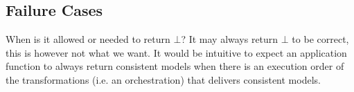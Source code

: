 




\subsection{Failure Cases} %
When is it allowed or needed to return $\bot$?
It may always return $\bot$ to be correct, this is however not what we want.
It would be intuitive to expect an application function to always return consistent models when there is an execution order of the transformations (i.e. an orchestration) that delivers consistent models.


